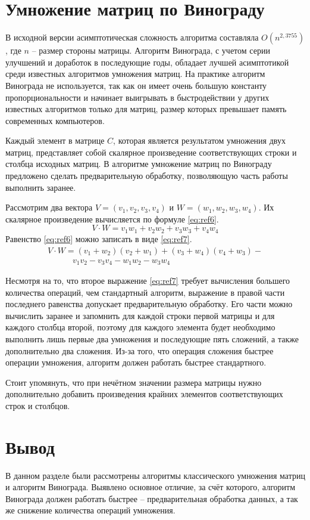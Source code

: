 \section{Умножение матриц по Винограду}

В исходной версии асимптотическая сложность алгоритма составляла $O(n^{2,3755})$, где $n$ -- размер стороны матрицы.
Алгоритм Винограда, с учетом серии улучшений и доработок в последующие годы, обладает лучшей асимптотикой среди известных алгоритмов умножения матриц.
На практике алгоритм Винограда не используется, так как он имеет очень большую константу пропорциональности и начинает выигрывать в быстродействии у других известных алгоритмов только для матриц, размер которых превышает память современных компьютеров.

Каждый элемент в матрице $C$, которая является результатом умножения двух матриц, представляет собой скалярное произведение соответствующих строки и столбца исходных матриц. 
В алгоритме умножение матриц по Винограду предложено сделать предварительную обработку, позволяющую часть работы выполнить заранее.

Рассмотрим два вектора $V = (v_1, v_2, v_3, v_4)$ и $W = (w_1, w_2, w_3, w_4)$.
Их скалярное произведение вычисляется по формуле  \ref{eq:ref6}.
\begin{equation}
	V \cdot W = v_1w_1 + v_2w_2 + v_3w_3 + v_4w_4
	\label{eq:ref6}
\end{equation}
Равенство \ref{eq:ref6} можно записать в виде \ref{eq:ref7}.
\begin{equation}
	\begin{array}{l}
		V \cdot W = (v_1 + w_2)(v_2 + w_1) + (v_3 + w_4)(v_4 + w_3) - \\
		\quad \quad \quad v_1v_2 - v_3v_4 - w_1w_2 - w_3w_4
	\end{array}
	\label{eq:ref7}
\end{equation}

Несмотря на то, что второе выражение \ref{eq:ref7} требует вычисления большего количества операций, чем стандартный алгоритм, выражение в правой части последнего равенства допускает предварительную обработку.
Его части можно вычислить заранее и запомнить для каждой строки первой матрицы и для каждого столбца второй, поэтому для каждого элемента будет необходимо выполнить лишь первые два умножения и последующие пять сложений, а также дополнительно два сложения. 
Из-за того, что операция сложения быстрее операции умножения, алгоритм должен работать быстрее стандартного.

Стоит упомянуть, что при нечётном значении размера матрицы нужно дополнительно добавить произведения крайних элементов соответствующих строк и столбцов.

\section*{Вывод}

В данном разделе были рассмотрены алгоритмы классического умножения матриц и алгоритм Винограда.
Выявлено основное отличие, за счёт которого, алгоритм Винограда должен работать быстрее -- предварительная обработка данных, а так же снижение количества операций умножения.
